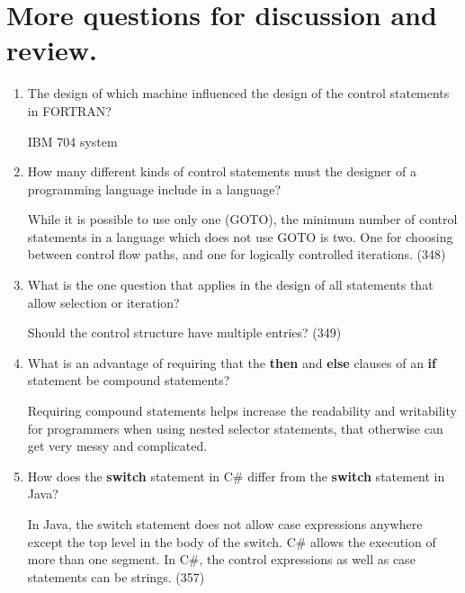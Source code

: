 \section{More questions for discussion and review.}

\begin{enumerate}
  \item The design of which machine influenced the design
    of the control statements in FORTRAN?
    
 \begin{answer}
    IBM 704 system 
     \end{answer}

  \item How many different kinds of control statements
    must the designer of a programming language include
    in a language?

 \begin{answer}
    While it is possible to use only one (GOTO), the minimum number of control statements in a language which does not use GOTO is two. One for choosing between control flow paths, and one for logically controlled iterations. (348)
 \end{answer}
 
  \item What is the one question that applies in the
    design of all statements that allow selection or
    iteration?

 \begin{answer}
    Should the control structure have multiple entries? (349)
 \end{answer}
 
  \item What is an advantage of requiring that
    the \textbf{then} and \textbf{else} clauses of
    an \textbf{if} statement be compound statements?

 \begin{answer}
    Requiring compound statements helps increase the readability and writability for programmers when using nested selector statements, that otherwise can get very messy and complicated.
 \end{answer}
 
  \item How does the \textbf{switch} statement in C\#
    differ from the \textbf{switch} statement in Java?

 \begin{answer}
   In Java, the switch statement does not allow case expressions anywhere except the top level in the body of the switch.  C\#  allows the execution of more than one segment. In C\#, the control expressions as well as case statements can be strings. (357)
 \end{answer}
 

\end{enumerate}
